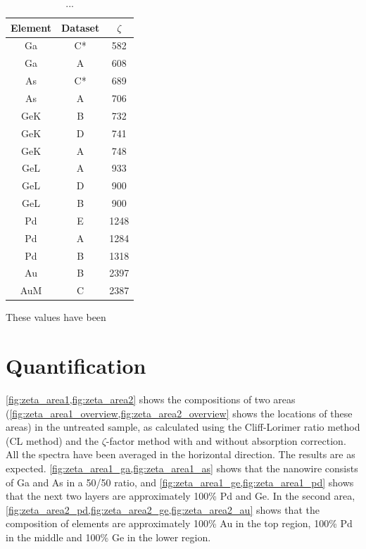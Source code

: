 \begin{table}
	\caption{...}
	\begin{center}
	\begin{tabular}{ccc}

	Element & Dataset & $\zeta$\\ 
	\midrule
	\hline
	Ga & C* & 582\\
	Ga & A  & 608\\
	As & C* & 689\\
	As & A  & 706\\
	GeK & B  & 732\\
	GeK & D  & 741\\
	GeK & A  & 748\\
	GeL & A & 933\\
	GeL & D & 900\\
	GeL & B & 900\\
	Pd & E  & 1248\\
	Pd & A  & 1284\\
	Pd & B  & 1318\\
	Au & B & 2397\\
	AuM & C & 2387\\
	\hline
	\end{tabular} 
	\end{center}
	\label{tab:non-heated zeta-values}
\end{table}

These values have been 


\section{Quantification}

\cref{fig:zeta_area1,fig:zeta_area2} shows the compositions of two areas (\cref{fig:zeta_area1_overview,fig:zeta_area2_overview} shows the locations of these areas) in the untreated sample, as calculated using the Cliff-Lorimer ratio method (CL method) and the $\zeta$-factor method with and without absorption correction. All the spectra have been averaged in the horizontal direction. The results are as expected. \cref{fig:zeta_area1_ga,fig:zeta_area1_as} shows that the nanowire consists of Ga and As in a 50/50 ratio, and \cref{fig:zeta_area1_ge,fig:zeta_area1_pd} shows that the next two layers are approximately 100\% Pd and Ge. In the second area, \cref{fig:zeta_area2_pd,fig:zeta_area2_ge,fig:zeta_area2_au} shows that the composition of elements are approximately 100\% Au in the top region, 100\% Pd in the middle and 100\% Ge in the lower region.

